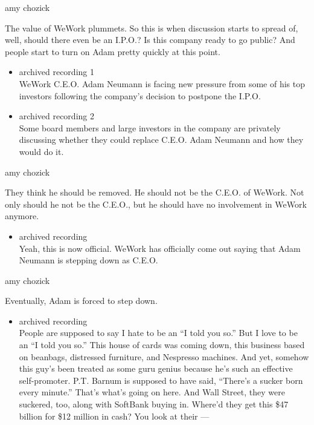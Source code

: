 amy chozick

The value of WeWork plummets. So this is when discussion starts to
spread of, well, should there even be an I.P.O.? Is this company ready
to go public? And people start to turn on Adam pretty quickly at this
point.

\begin{itemize}
\item
  archived recording 1\\
  WeWork C.E.O. Adam Neumann is facing new pressure from some of his top
  investors following the company's decision to postpone the I.P.O.
\item
  archived recording 2\\
  Some board members and large investors in the company are privately
  discussing whether they could replace C.E.O. Adam Neumann and how they
  would do it.
\end{itemize}

amy chozick

They think he should be removed. He should not be the C.E.O. of WeWork.
Not only should he not be the C.E.O., but he should have no involvement
in WeWork anymore.

\begin{itemize}
\tightlist
\item
  archived recording\\
  Yeah, this is now official. WeWork has officially come out saying that
  Adam Neumann is stepping down as C.E.O.
\end{itemize}

amy chozick

Eventually, Adam is forced to step down.

\begin{itemize}
\tightlist
\item
  archived recording\\
  People are supposed to say I hate to be an ``I told you so.'' But I
  love to be an ``I told you so.'' This house of cards was coming down,
  this business based on beanbags, distressed furniture, and Nespresso
  machines. And yet, somehow this guy's been treated as some guru genius
  because he's such an effective self-promoter. P.T. Barnum is supposed
  to have said, ``There's a sucker born every minute.'' That's what's
  going on here. And Wall Street, they were suckered, too, along with
  SoftBank buying in. Where'd they get this \$47 billion for \$12
  million in cash? You look at their ---
\end{itemize}

